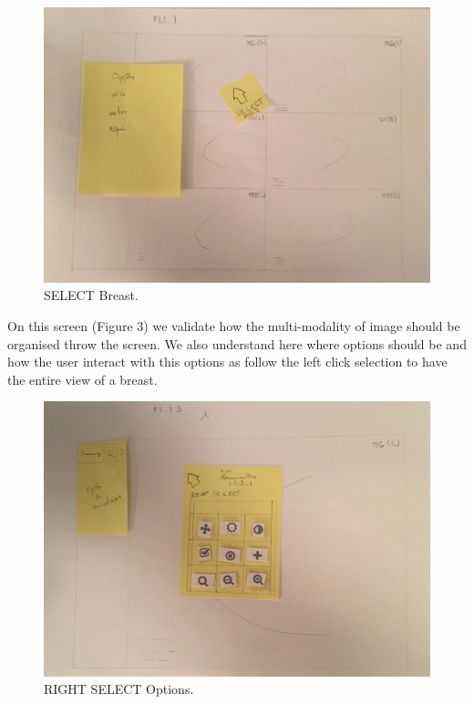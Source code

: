 \begin{figure}[!hbt]
\centering
\includegraphics[width=1.00\textwidth]{p111.png}
\caption{\label{fig:P 1.1.1}SELECT Breast.
}
\end{figure}

On this screen (Figure 3) we validate how the multi-modality of image should be organised throw the screen. We also understand here where options should be and how the user interact with this options as follow the left click selection to have the entire view of a breast.

\clearpage

\begin{figure}[!hbt]
\centering
\includegraphics[width=1.00\textwidth]{p113.png}
\caption{\label{fig:P 1.1.3}RIGHT SELECT Options.
}
\end{figure}

